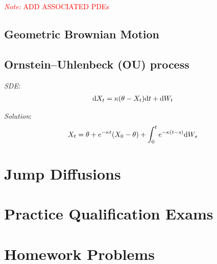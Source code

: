 \documentclass[12pt]{article}
\newcommand{\note}[1]{\textcolor{red}{\textit{Note:} #1}}
\begin{document}
\note{ADD ASSOCIATED PDEs}

\subsection{Geometric Brownian Motion}


\subsection{Ornstein--Uhlenbeck (OU) process}
\textit{SDE}:
\begin{align*}
    \mathrm{d} X_t = \kappa(\theta-X_t)\mathrm{d} t + \mathrm{d} W_t
\end{align*}

\textit{Solution}:
\begin{align*}
    X_t = \theta + e^{-\kappa t}(X_0-\theta) + \int_0^t e^{-\kappa(t-s)}\mathrm{d} W_s
\end{align*}



\pagebreak
\section{Jump Diffusions}



\pagebreak
\section{Practice Qualification Exams}


\pagebreak
\section{Homework Problems}








\end{document}
